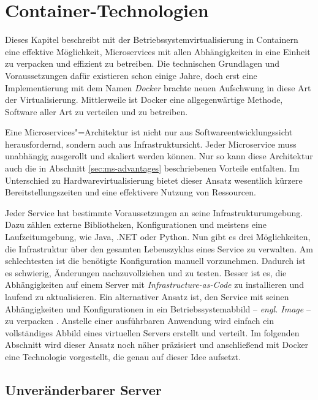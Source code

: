 \chapter{Container-Technologien}
\label{chap:containers}

Dieses Kapitel beschreibt mit der Betriebssystemvirtualisierung in Containern eine effektive Möglichkeit, Microservices mit allen Abhängigkeiten in eine Einheit zu verpacken und effizient zu betreiben. Die technischen Grundlagen und Voraussetzungen dafür existieren schon einige Jahre, doch erst eine Implementierung mit dem Namen \textit{Docker} brachte neuen Aufschwung in diese Art der Virtualisierung. Mittlerweile ist Docker eine allgegenwärtige Methode, Software aller Art zu verteilen und zu betreiben.

Eine Microservices"=Architektur ist nicht nur aus Softwareentwicklungssicht herausfordernd, sondern auch aus Infrastruktursicht. Jeder Microservice muss unabhängig ausgerollt und skaliert werden können. Nur so kann diese Architektur auch die in Abschnitt \ref{sec:ms-advantages} beschriebenen Vorteile entfalten. Im Unterschied zu Hardwarevirtualisierung bietet dieser Ansatz wesentlich kürzere Bereitstellungszeiten und eine effektivere Nutzung von Ressourcen.

Jeder Service hat bestimmte Voraussetzungen an seine Infrastrukturumgebung. Dazu zählen externe Bibliotheken, Konfigurationen und meistens eine Laufzeitumgebung, wie \zB Java, .NET oder Python. Nun gibt es drei Möglichkeiten, die Infrastruktur über den gesamten Lebenszyklus eines Service zu verwalten. Am schlechtesten ist die benötigte Konfiguration manuell vorzunehmen. Dadurch ist es schwierig, Änderungen nachzuvollziehen und zu testen. Besser ist es, die Abhängigkeiten auf einem Server mit \textit{Infrastructure-as-Code} zu installieren und laufend zu aktualisieren. Ein alternativer Ansatz ist, den Service mit seinen Abhängigkeiten und Konfigurationen in ein Betriebssystemabbild -- \textit{engl. Image} -- zu verpacken \cite[113]{newman2015building}. Anstelle einer ausführbaren Anwendung wird einfach ein vollständiges Abbild eines virtuellen Servers erstellt und verteilt. Im folgenden Abschnitt wird dieser Ansatz noch näher präzisiert und anschließend mit Docker eine Technologie vorgestellt, die genau auf dieser Idee aufsetzt.

\section{Unveränderbarer Server}
\label{sec:immutable-server}

